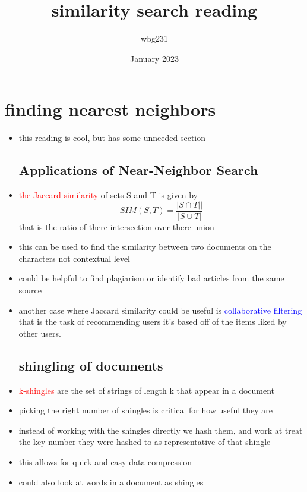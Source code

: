\documentclass{article}
\title{similarity search reading }
\author{wbg231 }
\date{January 2023}
\begin{document}
\maketitle

\section{finding nearest neighbors}
\begin{itemize}
\item this reading is cool, but has some unneeded section
\subsection*{Applications of Near-Neighbor Search}
\item \textcolor{red}{the Jaccard similarity } of sets S and T is given by $$SIM(S,T)=\frac{|S\cap T||}{|S\cup T|}$$ that is the ratio of there intersection over there union 
\item  this can be used to find the similarity between two documents on the characters not contextual level
\item could be helpful to find plagiarism or identify bad articles from the same source
\item another case where Jaccard similarity could be useful is \textcolor{blue}{collaborative filtering} that is the task of recommending users it's based off of the items liked by other users. 
\subsection*{shingling of documents}
\item \textcolor{red}{k-shingles} are the set of strings of length k that appear in a document
\item picking the right number of shingles is critical for how useful they are 
\item instead of working with the shingles directly we hash them, and work at treat the key number they were hashed to as representative of that shingle 
\item this allows for quick and easy data compression 
\item could also look at words in a document as shingles 

\end{itemize}
\end{document}
